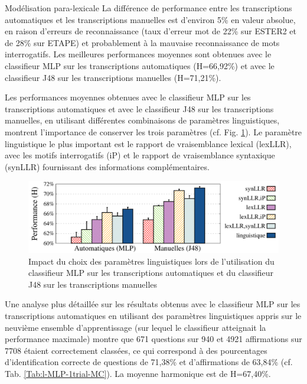 \documentclass{style/these}
\begin{document}
\begin{part}{Modélisation para-lexicale}
La différence de performance entre les transcriptions automatiques et les transcriptions manuelles est d'environ 5\% en valeur absolue, en raison d'erreurs de reconnaissance (taux d'erreur mot de 22\% sur ESTER2 et de 28\% sur ETAPE) et probablement à la mauvaise reconnaissance de mots interrogatifs. 
Les meilleures performances moyennes sont obtenues avec le  classifieur MLP sur les transcriptions automatiques (H=66,92\%) et avec le classifieur J48 sur les transcriptions manuelles (H=71,21\%). 

Les performances moyennes obtenues avec le classifieur MLP sur les transcriptions automatiques et avec le classifieur J48 sur les transcriptions manuelles, en utilisant différentes combinaisons de paramètres linguistiques, montrent l'importance de conserver les trois paramètres (cf. Fig. \ref{Fig:QD-L-LFeatures-MLP-J48}). 
Le paramètre linguistique le plus important est le rapport de vraisemblance lexical (lexLLR), avec les motifs interrogatifs (iP) et le rapport de vraisemblance syntaxique (synLLR) fournissant des informations complémentaires. 

\begin{figure}[h!]
\centering
\includegraphics[scale=0.56]{images/results/compareLinguisticFeatures.pdf}
\caption{Impact du choix des paramètres linguistiques lors de l'utilisation du classifieur MLP sur les transcriptions automatiques et du classifieur J48 sur les transcriptions manuelles}
\label{Fig:QD-L-LFeatures-MLP-J48}
\end{figure}

Une analyse plus détaillée sur les résultats obtenus avec le classifieur MLP sur les transcriptions automatiques  en utilisant des paramètres linguistiques appris sur le neuvième ensemble d'apprentissage (sur lequel le classifieur atteignait la performance maximale) montre que 671 questions sur 940 et 4921 affirmations sur 7708 étaient correctement classées, ce qui correspond à des pourcentages d'identification correcte de questions de 71,38\% et d'affirmations de 63,84\% (cf. Tab. \ref{Tab:l-MLP-1trial-MC}). 
La moyenne harmonique est de H=67,40\%. 



\end{part}
\end{document}
